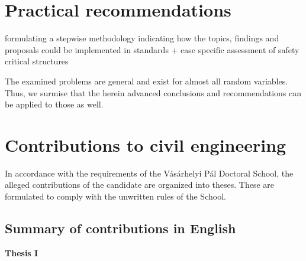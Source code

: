 \section{Practical recommendations}

formulating a stepwise methodology indicating how the topics, findings and proposals could be implemented in standards
+ case specific assessment of safety critical structures

The examined problems are general and exist for almost all random variables. Thus, we surmise that the herein advanced conclusions and recommendations can be applied to those as well.

\section{Contributions to civil engineering}

In accordance with the requirements of the Vásárhelyi Pál Doctoral School, the alleged contributions of the candidate are organized into theses. These are formulated to comply with the unwritten rules of the School.

\subsection*{Summary of contributions in English}

\begin{center}
  \textbf{Thesis I} \hfill
\end{center}

